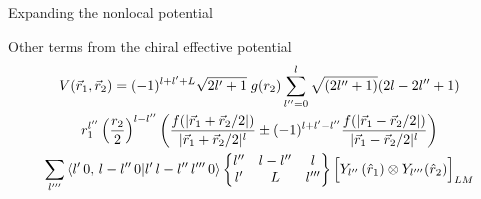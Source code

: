 \begin{section}{Expanding the nonlocal potential}
\begin{subsection}{Other terms from the chiral effective potential}
\begin{multline}
V(\vec{r}_1,\vec{r}_2)=(-1)^{l+l'+L}\sqrt{2l'+1}\;g(r_2) \sum_{l''=0}^{l} \sqrt{(2l''+1)}(2l-2l''+1)  \\
  r_1^{l''} \left(\frac{r_2}{2}\right)^{l-l''} \left(\frac{f(|\vec{r}_1+\vec{r}_2/2|)}{|\vec{r}_1+\vec{r}_2/2|^{l} } \pm (-1)^{l+l'-l''} \frac{f(|\vec{r}_1-\vec{r}_2/2|)}{|\vec{r}_1-\vec{r}_2/2|^{l} }\right) \\
\sum_{l'''} \braket{l'\,0,\,l-l''\,0 | l'\,l-l''\,l'''\,0} \begin{Bmatrix} l'' & l-l'' & l \\ l' & L & l''' \end{Bmatrix} \Big[Y_{l''}\left(\hat{r}_1\right) \otimes Y_{l'''}(\hat{r}_2) \Big]_{L M} 
\end{multline}

\end{subsection}

\end{section}
